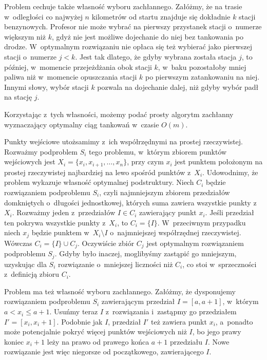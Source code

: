 Problem cechuje także własność wyboru zachłannego.
Załóżmy, że na trasie w~odległości co najwyżej $n$ kilometrów od startu znajduje się dokładnie $k$ stacji benzynowych.
Profesor nie może wybrać na pierwszy przystanek stacji o~numerze większym niż $k$, gdyż nie jest możliwe dojechanie do niej bez tankowania po drodze.
W~optymalnym rozwiązaniu nie opłaca się też wybierać jako pierwszej stacji o~numerze $j<k$.
Jest tak dlatego, że gdyby wybrana została stacja $j$, to później, w~momencie przejeżdżania obok stacji $k$, w~baku pozostałoby mniej paliwa niż w~momencie opuszczania stacji $k$ po pierwszym zatankowaniu na niej.
Innymi słowy, wybór stacji $k$ pozwala na dojechanie dalej, niż gdyby wybór padł na stację $j$.

Korzystając z~tych własności, możemy podać prosty algorytm zachłanny wyznaczający optymalny ciąg tankowań w~czasie $O(m)$.

\exercise %

\noindent Punkty wejściowe utożsamimy z~ich współrzędnymi na prostej rzeczywistej.
Rozważmy podproblem $S_i$ tego problemu, w~którym zbiorem punktów wejściowych jest $X_i=\{x_i,x_{i+1},\dots,x_n\}$, przy czym $x_i$ jest punktem położonym na prostej rzeczywistej najbardziej na lewo spośród punktów z~$X_i$.
Udowodnimy, że problem wykazuje własność optymalnej podstruktury.
Niech $C_i$ będzie rozwiązaniem podproblemu $S_i$, czyli najmniejszym zbiorem przedziałów domkniętych o~długości jednostkowej, których suma zawiera wszystkie punkty z~$X_i$.
Rozważmy jeden z~przedziałów $I\in C_i$ zawierający punkt $x_i$.
Jeśli przedział ten pokrywa wszystkie punkty z~$X_i$, to $C_i=\{I\}$.
W~przeciwnym przypadku niech $x_j$ będzie punktem w~$X_i\setminus I$ o~najmniejszej współrzędnej rzeczywistej.
Wówczas $C_i=\{I\}\cup C_j$.
Oczywiście zbiór $C_j$ jest optymalnym rozwiązaniem podproblemu $S_j$.
Gdyby było inaczej, moglibyśmy zastąpić go mniejszym, uzyskując dla $S_i$ rozwiązanie o~mniejszej liczności niż $C_i$, co stoi w~sprzeczności z~definicją zbioru $C_i$.

Problem ma też własność wyboru zachłannego.
Załóżmy, że dysponujemy rozwiązaniem podproblemu $S_i$ zawierającym przedział $I=[a,a+1]$, w~którym $a<x_i\le a+1$.
Usuńmy teraz $I$ z~rozwiązania i~zastąpmy go przedziałem $I'=[x_i,x_i+1]$.
Podobnie jak $I$, przedział $I'$ też zawiera punkt $x_i$, a~ponadto może potencjalnie pokryć więcej punktów wejściowych niż $I$, bo jego prawy koniec $x_i+1$ leży na prawo od prawego końca $a+1$ przedziału $I$.
Nowe rozwiązanie jest więc niegorsze od początkowego, zawierającego $I$.


